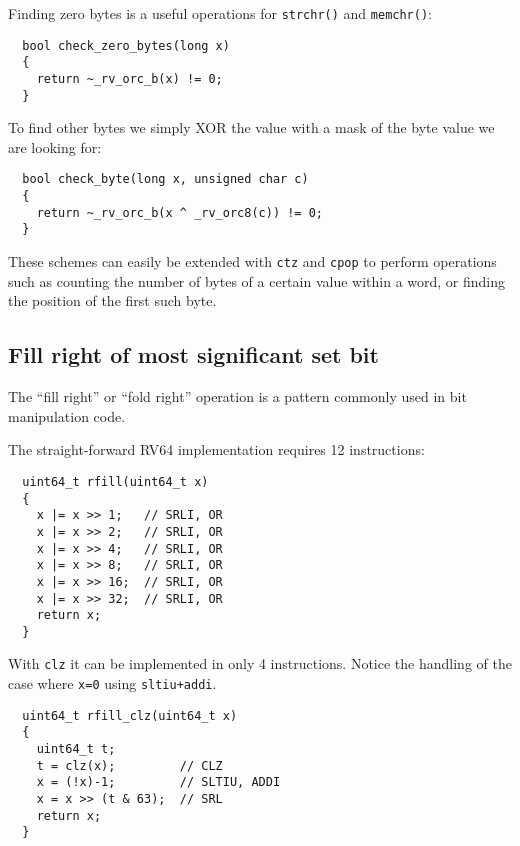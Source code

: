 Finding zero bytes is a useful operations for {\tt strchr()}
and {\tt memchr()}:

\begin{minipage}{\linewidth}
\begin{verbatim}
  bool check_zero_bytes(long x)
  {
    return ~_rv_orc_b(x) != 0;
  }
\end{verbatim}
\end{minipage}

To find other bytes we simply XOR the value with a mask of the byte value we
are looking for:

\begin{minipage}{\linewidth}
\begin{verbatim}
  bool check_byte(long x, unsigned char c)
  {
    return ~_rv_orc_b(x ^ _rv_orc8(c)) != 0;
  }
\end{verbatim}
\end{minipage}

These schemes can easily be extended with {\tt ctz} and {\tt cpop} to perform
operations such as counting the number of bytes of a certain value within a
word, or finding the position of the first such byte.


\subsection{Fill right of most significant set bit}

The ``fill right'' or ``fold right'' operation is a pattern commonly used in bit manipulation code.~\cite{MAGIC}

The straight-forward RV64 implementation requires 12 instructions:

\begin{minipage}{\linewidth}
\begin{verbatim}
  uint64_t rfill(uint64_t x)
  {
    x |= x >> 1;   // SRLI, OR
    x |= x >> 2;   // SRLI, OR
    x |= x >> 4;   // SRLI, OR
    x |= x >> 8;   // SRLI, OR
    x |= x >> 16;  // SRLI, OR
    x |= x >> 32;  // SRLI, OR
    return x;
  }
\end{verbatim}
\end{minipage}

With {\tt clz} it can be implemented in only 4 instructions. Notice the
handling of the case where {\tt x=0} using {\tt sltiu+addi}.

\begin{minipage}{\linewidth}
\begin{verbatim}
  uint64_t rfill_clz(uint64_t x)
  {
    uint64_t t;
    t = clz(x);         // CLZ
    x = (!x)-1;         // SLTIU, ADDI
    x = x >> (t & 63);  // SRL
    return x;
  }
\end{verbatim}
\end{minipage}

